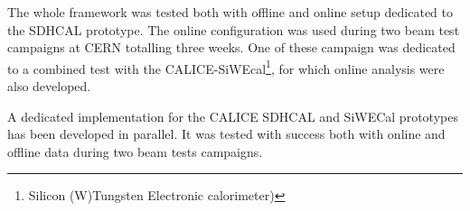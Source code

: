 \documentclass[conference]{IEEEtran}
\begin{document}
The whole framework was tested both with offline and online setup dedicated to the SDHCAL prototype. The online configuration was used during two beam test campaigns at CERN totalling three weeks. One of these campaign was dedicated to a combined test with the CALICE-SiWEcal\footnote{Silicon (W)Tungsten Electronic calorimeter)}, for which online analysis were also developed.


A dedicated implementation for the CALICE SDHCAL and SiWECal prototypes has been developed in parallel. It was tested with success both with online and offline data during two beam tests campaigns.



%
%



%
%
\end{document}
